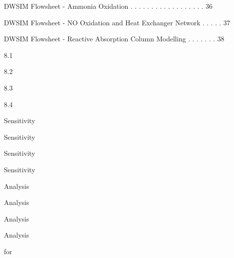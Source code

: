 \documentclass[a4paper,portrait,12pt]{article}
\begin{document}
\begin{flushleft}
DWSIM Flowsheet - Ammonia Oxidation . . . . . . . . . . . . . . . . . . 36
\end{flushleft}


\begin{flushleft}
DWSIM Flowsheet - NO Oxidation and Heat Exchanger Network . . . . . 37
\end{flushleft}


\begin{flushleft}
DWSIM Flowsheet - Reactive Absorption Column Modelling . . . . . . . 38
\end{flushleft}





8.1


8.2


8.3


8.4





\begin{flushleft}
Sensitivity
\end{flushleft}


\begin{flushleft}
Sensitivity
\end{flushleft}


\begin{flushleft}
Sensitivity
\end{flushleft}


\begin{flushleft}
Sensitivity
\end{flushleft}





\begin{flushleft}
Analysis
\end{flushleft}


\begin{flushleft}
Analysis
\end{flushleft}


\begin{flushleft}
Analysis
\end{flushleft}


\begin{flushleft}
Analysis
\end{flushleft}





\begin{flushleft}
for
\end{flushleft}
\end{document}
